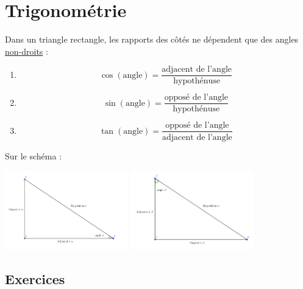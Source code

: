 \chapter{Trigonométrie}

\begin{theoreme}
Dans un triangle rectangle, les rapports des côtés ne dépendent que des angles \underline{non-droits} :
\begin{enumerate}
\item $$\cos(\mbox{angle}) = \frac{\mbox{adjacent de l'angle}}{\mbox{hypothénuse}}$$
\item $$\sin(\mbox{angle}) = \frac{\mbox{opposé de l'angle}}{\mbox{hypothénuse}}$$
\item $$\tan(\mbox{angle}) = \frac{\mbox{opposé de l'angle}}{\mbox{adjacent de l'angle}}$$
\end{enumerate}
\end{theoreme}

Sur le schéma :
\begin{center}
\includegraphics[width = 0.4\textwidth]{trigo/image/trigoalpha.png}
\includegraphics[width = 0.4\textwidth]{trigo/image/trigobeta.png}
\end{center}

\section{Exercices}

